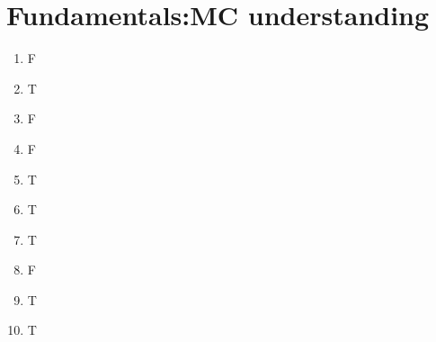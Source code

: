 \section{ Fundamentals:MC understanding }\label{sec:q1}
    
\begin{enumerate}[label=(\alph*)]
\item F
\item T 
\item F
\item F
\item T
\item T
\item T
\item F 
\item T
\item T
\end{enumerate}